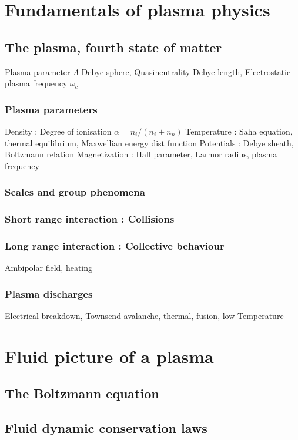 	\section{Fundamentals of plasma physics}
		\subsection{The plasma, fourth state of matter}
		Plasma parameter $\Lambda$ Debye sphere, Quasineutrality Debye length, Electrostatic plasma frequency $\omega_c$
			\subsubsection{Plasma parameters}
			Density : Degree of ionisation $\alpha=n_i/(n_i+n_n)$
			Temperature : Saha equation, thermal equilibrium, Maxwellian energy dist function
			Potentials : Debye sheath, Boltzmann relation
			Magnetization : Hall parameter, Larmor radius, plasma frequency
			\subsubsection{Scales and group phenomena}
			\subsubsection{Short range interaction : Collisions}
			\subsubsection{Long range interaction : Collective behaviour}
			Ambipolar field, heating
			\subsubsection{Plasma discharges}
			Electrical breakdown, Townsend avalanche, thermal, fusion, low-Temperature
	\section{Fluid picture of a plasma}
		\subsection{The Boltzmann equation}
		\subsection{Fluid dynamic conservation laws}
